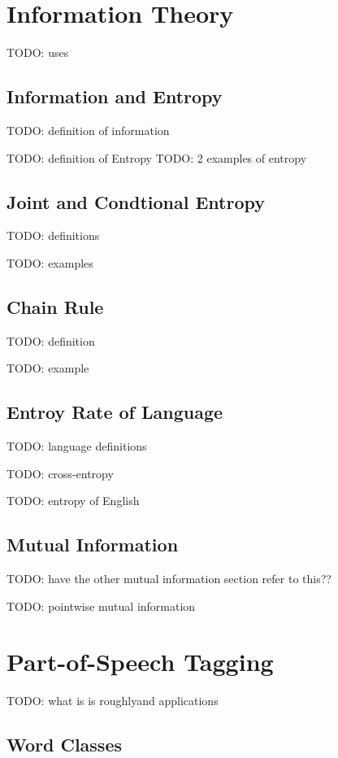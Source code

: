 \documentclass{article}
\begin{document}
\section{Information Theory}

TODO: uses

\subsection{Information and Entropy}

TODO: definition of information

TODO: definition of Entropy
TODO: 2 examples of entropy

\subsection{Joint and Condtional Entropy} 

TODO: definitions

TODO: examples

\subsection{Chain Rule}

TODO: definition

TODO: example

\subsection{Entroy Rate of Language}

TODO: language definitions

TODO: cross-entropy

TODO: entropy of English

\subsection{Mutual Information}

TODO: have the other mutual information section refer to this??

TODO: pointwise mutual information

\section{Part-of-Speech Tagging}

TODO: what is is roughlyand applications

\subsection{Word Classes}
\end{document}
